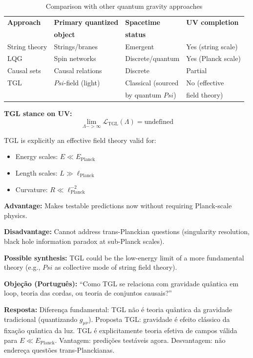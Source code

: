 \documentclass[12pt,a4paper]{article}
\def\Psi{Psi}%
\def\to{ -> }%
\begin{document}
\begin{table}[H]
\centering
\begin{tabular}{llll}
\toprule
\textbf{Approach} & \textbf{Primary quantized} & \textbf{Spacetime} & \textbf{UV completion} \\
 & \textbf{object} & \textbf{status} & \\
\midrule
String theory & Strings/branes & Emergent & Yes (string scale) \\
LQG & Spin networks & Discrete/quantum & Yes (Planck scale) \\
Causal sets & Causal relations & Discrete & Partial \\
TGL & $\Psi$-field (light) & Classical (sourced & No (effective \\
 &  & by quantum $\Psi$) & field theory) \\
\bottomrule
\end{tabular}
\caption{Comparison with other quantum gravity approaches}
\end{table}

\textbf{TGL stance on UV:}
\begin{equation}
\lim_{\Lambda \to \infty}\mathcal{L}_{\text{TGL}}(\Lambda) = \text{undefined}
\end{equation}

TGL is explicitly an effective field theory valid for:
\begin{itemize}
    \item Energy scales: $E \ll E_{\text{Planck}}$
    \item Length scales: $L \gg \ell_{\text{Planck}}$
    \item Curvature: $R \ll \ell_{\text{Planck}}^{-2}$
\end{itemize}

\textbf{Advantage:} Makes testable predictions now without requiring Planck-scale physics.

\textbf{Disadvantage:} Cannot address trans-Planckian questions (singularity resolution, black hole information paradox at sub-Planck scales).

\textbf{Possible synthesis:} TGL could be the low-energy limit of a more fundamental theory (e.g., $\Psi$ as collective mode of string field theory).

\textbf{Objeção (Português):} ``Como TGL se relaciona com gravidade quântica em loop, teoria das cordas, ou teoria de conjuntos causais?''

\textbf{Resposta:} Diferença fundamental: TGL não é teoria quântica da gravidade tradicional (quantizando $g_{\mu\nu}$). Proposta TGL: gravidade é efeito clássico da fixação quântica da luz. TGL é explicitamente teoria efetiva de campos válida para $E \ll E_{\text{Planck}}$. Vantagem: predições testáveis agora. Desvantagem: não endereça questões trans-Planckianas.
\end{document}
